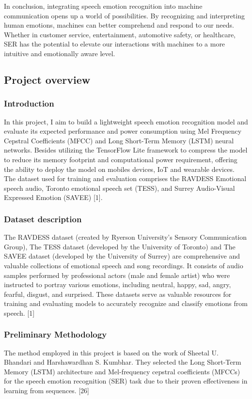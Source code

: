 In conclusion, integrating speech emotion recognition into machine communication opens up a world of possibilities. 
By recognizing and interpreting human emotions, machines can better comprehend and respond to our needs. Whether in customer service, entertainment, automotive safety, or healthcare, SER has the potential to elevate our interactions with machines to a more intuitive and emotionally aware level.

\subsection{Project overview}
\subsubsection{Introduction}
In this project, I aim to build a lightweight speech emotion recognition model and evaluate its expected performance and power consumption 
using Mel Frequency Cepstral Coefficients (MFCC) and Long Short-Term Memory (LSTM) neural networks. Besides utilizing the TensorFlow Lite framework to compress the model to reduce its memory footprint and computational power requirement, offering the ability to deploy the model on mobiles devices, IoT and wearable devices.
The dataset used for training and evaluation comprises the RAVDESS Emotional speech audio, Toronto emotional speech set (TESS), and Surrey Audio-Visual Expressed Emotion (SAVEE) [1].

\subsubsection{Dataset description}
The RAVDESS dataset (created by Ryerson University's Sensory Communication Group), The TESS dataset (developed by the University of Toronto) and The SAVEE dataset (developed by the University of Surrey) are comprehensive and valuable collections of emotional speech and song recordings.
It consists of audio samples performed by professional actors (male and female artist) who were instructed to portray various emotions, including neutral, happy, sad, angry, fearful, disgust, and surprised.
These datasets serve as valuable resources for training and evaluating models to accurately recognize and classify emotions from speech. [1]

\subsubsection{Preliminary Methodology}
The method employed in this project is based on the work of Sheetal U. Bhandari and Harshawardhan S. Kumbhar. They selected the Long Short-Term Memory (LSTM) architecture and Mel-frequency cepstral coefficients (MFCCs) for the speech emotion recognition (SER) task due to their proven effectiveness in learning from sequences. [26]

